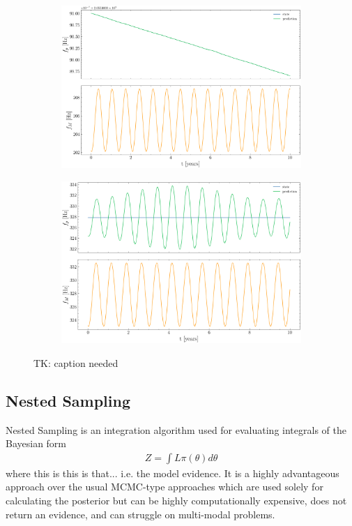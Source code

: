 \documentclass[fleqn,usenatbib,useAMS]{mnras}
\begin{document}
\begin{figure}
	\begin{subfigure}[b]{1\columnwidth}
		\includegraphics[width=\textwidth]{images/KF1}
		\caption{}
		\label{fig:6MB_BFS}
	\end{subfigure}
	\hfill
	\begin{subfigure}[b]{1\columnwidth}
		\includegraphics[width=\textwidth]{images/KF2}
		\caption{}
		\label{fig:25MB_bfs}
	\end{subfigure}
\caption{TK: caption needed}
	\label{fig:four figures}
\end{figure}



\subsection{Nested Sampling}
Nested Sampling \cite{Skilling} is an integration algorithm used for evaluating integrals of the Bayesian form
\begin{eqnarray}
	Z = \int L \pi (\theta) d \theta
\end{eqnarray}
where this is this is that... i.e. the model evidence. It is a highly advantageous approach over the usual MCMC-type approaches which are used solely for calculating the posterior but can be highly computationally expensive, does not return an evidence, and can struggle on multi-modal problems. 
\end{document}
